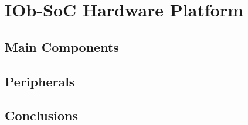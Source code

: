 
\chapter{IOb-SoC Hardware Platform}
\label{chapter:IOb-SoC}



\section{Main Components}
\label{section:main_components}




\section{Peripherals}
\label{section:peripherals}



\section{Conclusions}
\label{section:iob_soc_conclusions}



